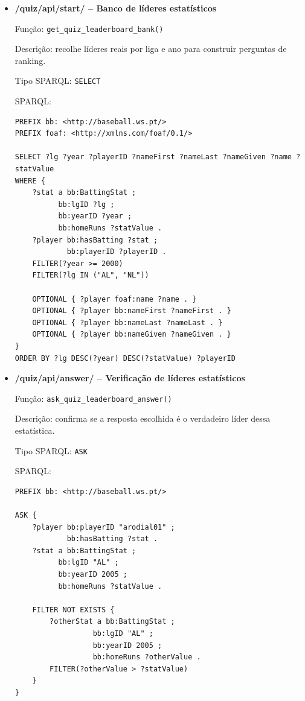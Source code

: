 \begin{itemize}[leftmargin=*]
  \item \textbf{/quiz/api/start/ -- Banco de líderes estatísticos}
  
  Fun\c{c}\~ao: \texttt{get\_quiz\_leaderboard\_bank()}
  
  Descri\c{c}\~ao: recolhe líderes reais por liga e ano para construir perguntas de ranking.
  
  Tipo SPARQL: \texttt{SELECT}

  SPARQL:

\begin{Verbatim}[fontsize=\scriptsize,breaklines=true]
PREFIX bb: <http://baseball.ws.pt/>
PREFIX foaf: <http://xmlns.com/foaf/0.1/>

SELECT ?lg ?year ?playerID ?nameFirst ?nameLast ?nameGiven ?name ?statValue
WHERE {
    ?stat a bb:BattingStat ;
          bb:lgID ?lg ;
          bb:yearID ?year ;
          bb:homeRuns ?statValue .
    ?player bb:hasBatting ?stat ;
            bb:playerID ?playerID .
    FILTER(?year >= 2000)
    FILTER(?lg IN ("AL", "NL"))

    OPTIONAL { ?player foaf:name ?name . }
    OPTIONAL { ?player bb:nameFirst ?nameFirst . }
    OPTIONAL { ?player bb:nameLast ?nameLast . }
    OPTIONAL { ?player bb:nameGiven ?nameGiven . }
}
ORDER BY ?lg DESC(?year) DESC(?statValue) ?playerID
\end{Verbatim}

  \item \textbf{/quiz/api/answer/ -- Verifica\c{c}\~ao de líderes estatísticos}
  
  Fun\c{c}\~ao: \texttt{ask\_quiz\_leaderboard\_answer()}
  
  Descri\c{c}\~ao: confirma se a resposta escolhida é o verdadeiro líder dessa estatística.
  
  Tipo SPARQL: \texttt{ASK}

  SPARQL:

\begin{Verbatim}[fontsize=\scriptsize,breaklines=true]
PREFIX bb: <http://baseball.ws.pt/>

ASK {
    ?player bb:playerID "arodial01" ;
            bb:hasBatting ?stat .
    ?stat a bb:BattingStat ;
          bb:lgID "AL" ;
          bb:yearID 2005 ;
          bb:homeRuns ?statValue .

    FILTER NOT EXISTS {
        ?otherStat a bb:BattingStat ;
                  bb:lgID "AL" ;
                  bb:yearID 2005 ;
                  bb:homeRuns ?otherValue .
        FILTER(?otherValue > ?statValue)
    }
}
\end{Verbatim}
\end{itemize}

